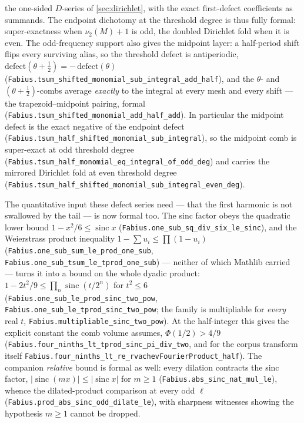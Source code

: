 \documentclass[11pt,oneside]{article}
\numberwithin{equation}{section}
\theoremstyle{definition}
\theoremstyle{remark}
\newcommand{\vtwo}{\nu_2}
\begin{document}
the one-sided $D$-series of \cref{sec:dirichlet}, with the exact first-defect
coefficients as summands.  The endpoint dichotomy at the threshold degree is thus
fully formal: super-exactness when $\vtwo(M)+1$ is odd, the doubled Dirichlet fold
when it is even.  The odd-frequency support also gives the midpoint layer: a
half-period shift flips every surviving alias, so the threshold defect is
antiperiodic,
$\mathrm{defect}(\theta+\tfrac12)=-\,\mathrm{defect}(\theta)$
(\nolinkurl{Fabius.tsum_shifted_monomial_sub_integral_add_half}), and the $\theta$- and
$(\theta+\tfrac12)$-combs average \emph{exactly} to the integral at every mesh and
every shift --- the trapezoid--midpoint pairing, formal
(\nolinkurl{Fabius.tsum_shifted_monomial_add_half_add}).  In particular the midpoint
defect is the exact negative of the endpoint defect
(\nolinkurl{Fabius.tsum_half_shifted_monomial_sub_integral}), so the midpoint comb is
super-exact at odd threshold degree
(\nolinkurl{Fabius.tsum_half_monomial_eq_integral_of_odd_deg}) and carries the mirrored
Dirichlet fold at even threshold degree
(\nolinkurl{Fabius.tsum_half_shifted_monomial_sub_integral_even_deg}).

The quantitative input these defect series need --- that the first harmonic is not
swallowed by the tail --- is now formal too.  The sinc factor obeys the quadratic lower
bound \(1-x^2/6\le\operatorname{sinc}x\) (\nolinkurl{Fabius.one_sub_sq_div_six_le_sinc}),
and the Weierstrass product inequality \(1-\sum u_i\le\prod(1-u_i)\)
(\nolinkurl{Fabius.one_sub_sum_le_prod_one_sub}, \nolinkurl{Fabius.one_sub_tsum_le_tprod_one_sub}) ---
neither of which Mathlib carried --- turns it into a bound on the whole dyadic product:
\(1-2t^2/9\le\prod_{n}\operatorname{sinc}(t/2^n)\) for \(t^2\le6\)
(\nolinkurl{Fabius.one_sub_le_prod_sinc_two_pow}, \nolinkurl{Fabius.one_sub_le_tprod_sinc_two_pow};
the family is multipliable for \emph{every} real \(t\),
\nolinkurl{Fabius.multipliable_sinc_two_pow}).  At the half-integer this gives the
explicit constant the comb volume assumes,
\(\Phi(1/2)>4/9\)
(\nolinkurl{Fabius.four_ninths_lt_tprod_sinc_pi_div_two}, and for the corpus transform
itself \nolinkurl{Fabius.four_ninths_lt_re_rvachevFourierProduct_half}).  The companion
\emph{relative} bound is formal as well: every dilation contracts the sinc factor,
\(\lvert\operatorname{sinc}(mx)\rvert\le\lvert\operatorname{sinc}x\rvert\) for \(m\ge1\)
(\nolinkurl{Fabius.abs_sinc_nat_mul_le}), whence the dilated-product comparison at every
odd \(\ell\) (\nolinkurl{Fabius.prod_abs_sinc_odd_dilate_le}), with sharpness witnesses
showing the hypothesis \(m\ge1\) cannot be dropped.
\end{document}

